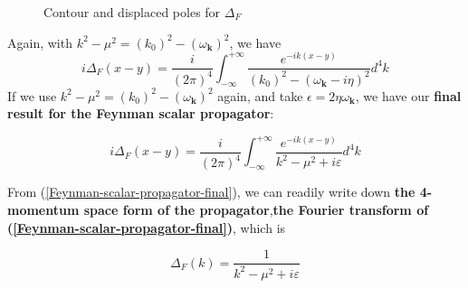 \begin{figure}[H]

    \caption{Contour and displaced poles for $\Delta_F$}
    \label{fig:displaced-pole}
\end{figure}
Again, with $k^{2}-\mu^{2}=\left(k_{0}\right)^{2}-\left(\omega_{\mathbf{k}}\right)^{2}$, we have
$$
i \Delta_{F}(x-y)=\frac{i}{(2 \pi)^{4}} \int_{-\infty}^{+\infty} \frac{e^{-i k(x-y)}}{\left(k_{0}\right)^{2}-\left(\omega_{\mathbf{k}}-i \eta\right)^{2}} d^{4} k
$$
If we use $k^{2}-\mu^{2}=\left(k_{0}\right)^{2}-\left(\omega_{\mathbf{k}}\right)^{2}$ again, and take $\epsilon=2\eta\omega_{\mathbf{k}}$, we have our \textbf{final result for the Feynman scalar propagator}:
\begin{qt}
    \begin{equation}
i \Delta_{F}(x-y)=\frac{i}{(2 \pi)^{4}} \int_{-\infty}^{+\infty} \frac{e^{-i k(x-y)}}{k^{2}-\mu^{2}+i \varepsilon} d^{4} k
\label{Feynman-scalar-propagator-final}
\end{equation}
\end{qt}
From (\ref{Feynman-scalar-propagator-final}), we can readily write down \textbf{the 4-momentum space form of the propagator},\textbf{the Fourier transform of (\ref{Feynman-scalar-propagator-final})}, which is
\begin{qt}
    \begin{equation}
\Delta_{F}(k)=\frac{1}{k^{2}-\mu^{2}+i \varepsilon}
\end{equation}
\end{qt}